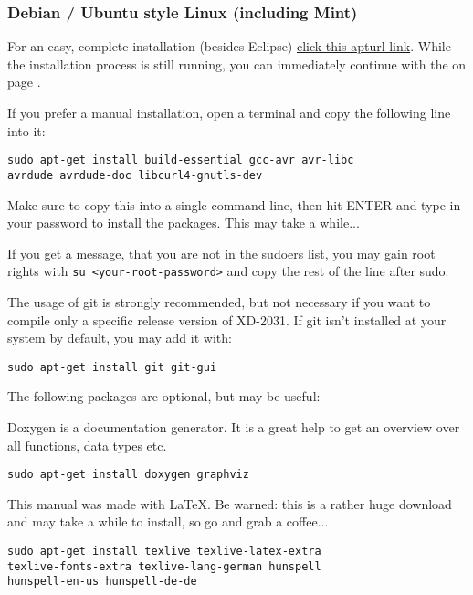 \subsubsection{Debian / Ubuntu style Linux (including Mint)}
For an easy, complete installation (besides Eclipse) 
\href{apt://build-essential,gcc-avr,avr-libc,avrdude,avrdude-doc,libcurl4-gnutls-dev,git,git-gui,doxygen,graphviz,texlive,texlive-latex-extra,texlive-fonts-extra,texlive-lang-german,hunspell,hunspell-en-us,hunspell-de-de}{click this apturl-link}.
While the installation process is still running, you can immediately 
continue with the 
 on page \pageref{eclipseinst}.

If you prefer a manual installation, open a terminal and copy the following line into it:

\begin{verbatim}
sudo apt-get install build-essential gcc-avr avr-libc 
avrdude avrdude-doc libcurl4-gnutls-dev
\end{verbatim}

Make sure to copy this into a single command line, then hit ENTER 
and type in your password to install the packages. 
This may take a while...  

If you get a message, that you are not in the 
sudoers list, you may gain root rights with \texttt{su <your-root-password>} 
and copy the rest of the line after sudo.

The usage of git is strongly recommended, but not necessary if you want to
compile only a specific release version of XD-2031. If git isn't installed
at your system by default, you may add it with:

\begin{verbatim}
sudo apt-get install git git-gui
\end{verbatim}

The following packages are optional, but may be useful: 

Doxygen is a
documentation generator. It is a great help to get an overview over all
functions, data types etc. 

\begin{verbatim}
sudo apt-get install doxygen graphviz
\end{verbatim}

This manual was made with \LaTeX{}. Be warned: this is a rather huge
download and may take a while to install, so go and grab a coffee...

\begin{verbatim}
sudo apt-get install texlive texlive-latex-extra 
texlive-fonts-extra texlive-lang-german hunspell 
hunspell-en-us hunspell-de-de
\end{verbatim}

